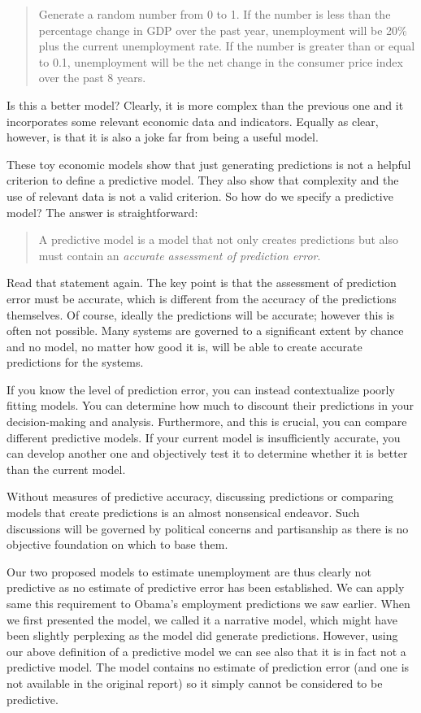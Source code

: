 \documentclass[]{memoir}
\begin{document}
\begin{quote}
Generate a random number from 0 to 1. If the number is less than the
percentage change in GDP over the past year, unemployment will be 20\%
plus the current unemployment rate. If the number is greater than or
equal to 0.1, unemployment will be the net change in the consumer price
index over the past 8 years.
\end{quote}

Is this a better model? Clearly, it is more complex than the previous
one and it incorporates some relevant economic data and indicators.
Equally as clear, however, is that it is also a joke far from being a
useful model.

These toy economic models show that just generating predictions is not a
helpful criterion to define a predictive model. They also show that
complexity and the use of relevant data is not a valid criterion. So how
do we specify a predictive model? The answer is straightforward:

\begin{quote}
A predictive model is a model that not only creates predictions but also
must contain an \emph{accurate assessment of prediction error}.
\end{quote}

Read that statement again. The key point is that the assessment of
prediction error must be accurate, which is different from the accuracy
of the predictions themselves. Of course, ideally the predictions will
be accurate; however this is often not possible. Many systems are
governed to a significant extent by chance and no model, no matter how
good it is, will be able to create accurate predictions for the systems.

If you know the level of prediction error, you can instead contextualize
poorly fitting models. You can determine how much to discount their
predictions in your decision-making and analysis. Furthermore, and this
is crucial, you can compare different predictive models. If your current
model is insufficiently accurate, you can develop another one and
objectively test it to determine whether it is better than the current
model.

Without measures of predictive accuracy, discussing predictions or
comparing models that create predictions is an almost nonsensical
endeavor. Such discussions will be governed by political concerns and
partisanship as there is no objective foundation on which to base them.

Our two proposed models to estimate unemployment are thus clearly not
predictive as no estimate of predictive error has been established. We
can apply same this requirement to Obama's employment predictions we saw
earlier. When we first presented the model, we called it a narrative
model, which might have been slightly perplexing as the model did
generate predictions. However, using our above definition of a
predictive model we can see also that it is in fact not a predictive
model. The model contains no estimate of prediction error (and one is
not available in the original report) so it simply cannot be considered
to be predictive.
\end{document}
